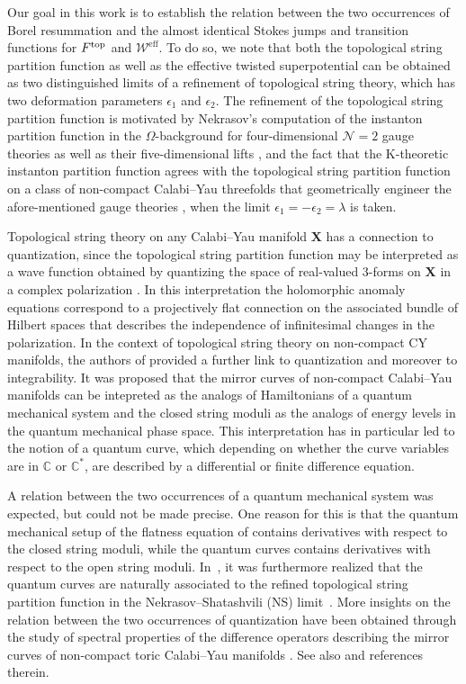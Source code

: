 \documentclass[pdftex]{sigma}
\numberwithin{equation}{section}
\begin{document}
Our goal in this work is to establish the relation between the two occurrences of Borel resummation and the almost identical Stokes jumps and transition functions for $F^{\rm top}$ and $\mathcal{W}^{\mathrm{eff}}$. To do so, we note that both the topological string partition function as well as the effective twisted superpotential can be obtained as two distinguished limits of a refinement of topological string theory, which has two deformation parameters $\epsilon_1$ and $\epsilon_2$. The refinement of the topological string partition function is motivated by Nekrasov's computation of the instanton partition function in the $\Omega$-background for four-dimensional $\mathcal{N}=2$ gauge theories as well as their five-dimensional lifts \cite{Nekrasov:2002qd}, and the fact that the K-theoretic instanton partition function agrees with the topological string partition function on a class of non-compact Calabi--Yau threefolds that geometrically engineer the afore-mentioned gauge theories \cite{Katz:1997eq,KKV}, when the limit $\epsilon_1=-\epsilon_2=\lambda$ is taken.

Topological string theory on any Calabi--Yau manifold $\mathbf{X}$ has a connection to quantization, since the topological string partition function may be interpreted as a wave function obtained by quantizing the space of real-valued 3-forms on $\mathbf{X}$ in a complex polarization \cite{Witten:1993ed}. In this interpretation the holomorphic anomaly equations \cite{Bershadsky:1993cx} correspond to a projectively flat connection on the associated bundle of Hilbert spaces that describes the independence of infinitesimal changes in the polarization. In the context of topological string theory on non-compact CY manifolds, the authors of \cite{ADKMV} provided a further link to quantization and moreover to integrability. It was proposed that the mirror curves of non-compact Calabi--Yau manifolds can be intepreted as the analogs of Hamiltonians of a quantum mechanical system and the closed string moduli as the analogs of energy levels in the quantum mechanical phase space. This interpretation has in particular led to the notion of a quantum curve, which depending on whether the curve variables are in $\mathbb{C}$ or $\mathbb{C}^*$, are described by a differential or finite difference equation.

A relation between the two occurrences of a quantum mechanical system was expected, but could not be made precise. One reason for this is that the quantum mechanical setup of the flatness equation of \cite{Witten:1993ed} contains derivatives with respect to the closed string moduli, while the quantum curves contains derivatives with respect to the open string moduli. In~\cite{ACDKV}, it was furthermore realized that the quantum curves are naturally associated to the refined topological string partition function in the Nekrasov--Shatashvili (NS) limit~\cite{NS}. More insights on the relation between the two occurrences of quantization have been obtained through the study of spectral properties of the difference operators describing the mirror curves of non-compact toric Calabi--Yau manifolds \cite{GHM}. See also \cite{MarinoSpectral} and references therein.
\end{document}
